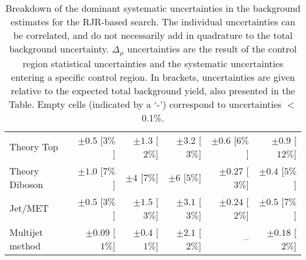 \begin{table}[hbtp]
\begin{center}
\begin{tabular}{|lrrrrr|}
Theory Top   &  $\pm 0.5$ [$3\%$]  &  $\pm 1.3$ [$2\%$]  &  $\pm 3.2$ [$3\%$]  &  $\pm 0.6$ [$6\%$]  &  $\pm 0.9$ [$12\%$] \\
Theory Diboson  &  $\pm 1.0$ [$7\%$]  &  $\pm 4$ [$7\%$]  &  $\pm 6$ [$5\%$]  &  $\pm 0.27$ [$3\%$]  &  $\pm 0.4$ [$5\%$] \\
Jet/MET   &  $\pm 0.5$ [$3\%$]  &  $\pm 1.5$ [$3\%$]  &  $\pm 3.1$ [$3\%$]  &  $\pm 0.24$ [$2\%$]  &  $\pm 0.5$ [$7\%$] \\
Multijet method  &  $\pm 0.09$ [$1\%$]  &  $\pm 0.4$ [$1\%$]  &  $\pm 2.1$ [$2\%$]  &   --    &  $\pm 0.18$ [$2\%$] \\
\hline
\end{tabular}

\end{center}
\caption[Breakdown of uncertainty on background estimates]{
Breakdown of the dominant systematic uncertainties in the background estimates for the RJR-based search.
The individual uncertainties can be correlated, and do not necessarily add in quadrature to
the total background uncertainty. $\Delta_{\mu}$ uncertainties are the result of the control region statistical uncertainties and the systematic uncertainties entering a specific control region. In brackets, uncertainties are given relative to the expected total background yield, also presented in the Table. Empty cells (indicated by a `-') correspond to uncertainties $<$0.1\%. \label{tab:BreakdownSysSRCompressed_RJR}}
\end{table}
